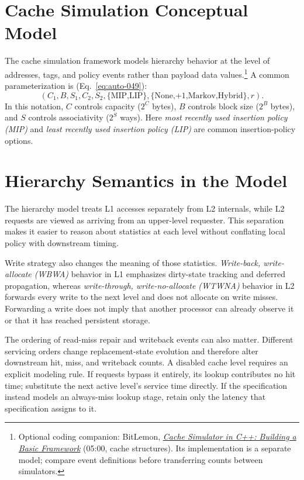 \section{Cache Simulation Conceptual Model}\label{sec:auto-050}
The cache simulation framework models hierarchy behavior at the level of addresses, tags, and policy events rather than payload data values.\footnote{Optional coding companion: BitLemon, \href{https://youtu.be/ss-PDXKKjH8?t=300}{\emph{Cache Simulator in C++: Building a Basic Framework}} (05:00, cache structures). Its implementation is a separate model; compare event definitions before transferring counts between simulators.}
A common parameterization is (Eq.~\eqref{eq:auto-049}):
\begin{equation}\label{eq:auto-049}
    (C_1,B,S_1,C_2,S_2,\{\text{MIP,LIP}\},\{\text{None,+1,Markov,Hybrid}\},r).
\end{equation}
In this notation, $C$ controls capacity ($2^C$ bytes), $B$ controls block size ($2^B$ bytes), and $S$ controls associativity ($2^S$ ways).
Here \textit{most recently used insertion policy (MIP)} and \textit{least recently used insertion policy (LIP)} are common insertion-policy options.


\section{Hierarchy Semantics in the Model}\label{sec:auto-051}
The hierarchy model treats L1 accesses separately from L2 internals, while L2 requests are viewed as arriving from an upper-level requester.
This separation makes it easier to reason about statistics at each level without conflating local policy with downstream timing.

Write strategy also changes the meaning of those statistics.
\textit{Write-back, write-allocate (WBWA)} behavior in L1 emphasizes dirty-state tracking and deferred propagation, whereas \textit{write-through, write-no-allocate (WTWNA)} behavior in L2 forwards every write to the next level and does not allocate on write misses.
Forwarding a write does not imply that another processor can already observe it or that it has reached persistent storage.

The ordering of read-miss repair and writeback events can also matter.
Different servicing orders change replacement-state evolution and therefore alter downstream hit, miss, and writeback counts.
A disabled cache level requires an explicit modeling rule.
If requests bypass it entirely, its lookup contributes no hit time; substitute the next active level's service time directly.
If the specification instead models an always-miss lookup stage, retain only the latency that specification assigns to it.


